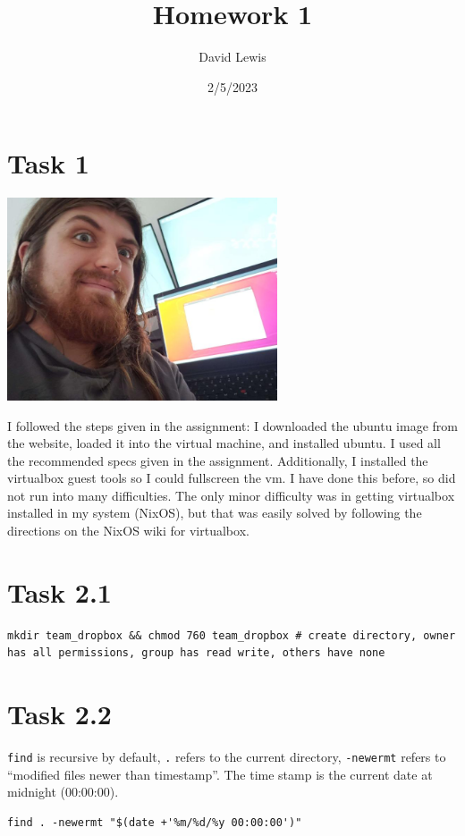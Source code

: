 \documentclass[11pt]{article}
\author{David Lewis}
\date{2/5/2023}
\title{Homework 1}
\begin{document}
\maketitle
\section*{Task 1}
\label{sec:orga029af4}
\begin{center}
\includegraphics[width=8cm]{ubuntu-settings.jpg}
\end{center}
I followed the steps given in the assignment: I downloaded the ubuntu image from
the website, loaded it into the virtual machine, and installed ubuntu. I used
all the recommended specs given in the assignment. Additionally, I installed the
virtualbox guest tools so I could fullscreen the vm. I have done this before, so
did not run into many difficulties. The only minor difficulty was in getting
virtualbox installed in my system (NixOS), but that was easily solved by
following the directions on the NixOS wiki for virtualbox.
\section*{Task 2.1}
\label{sec:org8f4a65f}
\begin{verbatim}
mkdir team_dropbox && chmod 760 team_dropbox # create directory, owner has all permissions, group has read write, others have none
\end{verbatim}
\section*{Task 2.2}
\label{sec:orgc87181c}
\texttt{find} is recursive by default, \texttt{.}  refers to the current directory, \texttt{-newermt}
refers to ``modified files newer than timestamp''. The time stamp is the current
date at midnight (00:00:00).
\begin{verbatim}
find . -newermt "$(date +'%m/%d/%y 00:00:00')"
\end{verbatim}
\end{document}
